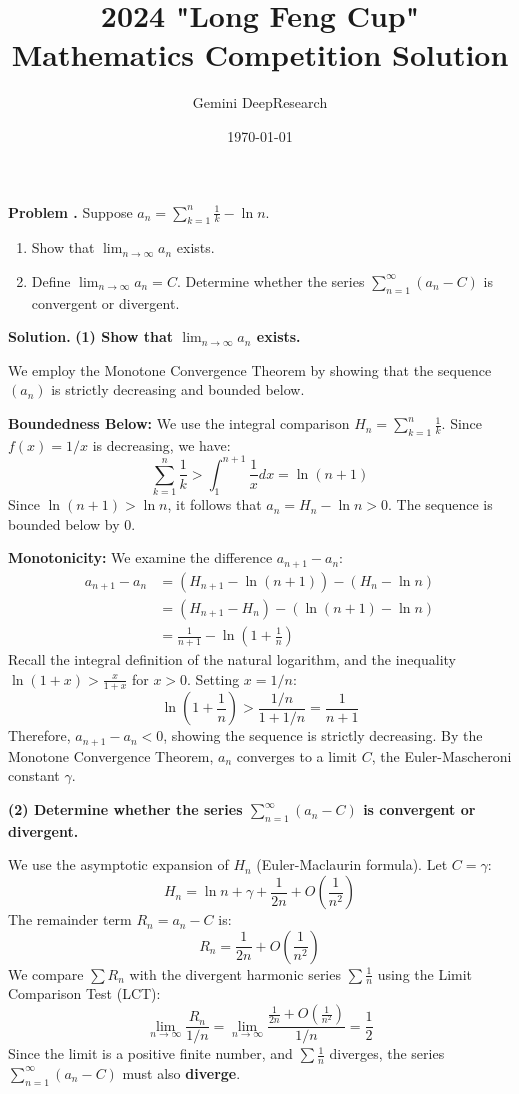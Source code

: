 \documentclass[12pt,a4paper,oneside]{article}
\title{\textbf{2024 "Long Feng Cup" Mathematics Competition Solution }}
\author{Gemini DeepResearch}
\date{\today}
\newcounter{problemname}
\newenvironment{problem}
  {\begin{shaded}\stepcounter{problemname}\par\noindent\textbf{Problem \arabic{problemname}.
}\newline}
  {\end{shaded}\par}
\newenvironment{solution}
  {\par\noindent\textbf{Solution. }\newline}
  {\par}
\begin{document}
\maketitle

\newpage
\begin{problem}
Suppose $a_{n}=\sum_{k=1}^{n}\frac{1}{k}-\ln n.$
\begin{enumerate}
\item Show that $\lim_{n\rightarrow\infty}a_{n}$ exists.
\item  Define $\lim_{n\rightarrow\infty}a_{n}=C.$ Determine whether the series $\sum_{n=1}^{\infty}(a_{n}-C)$ is convergent or divergent.
\end{enumerate}
\end{problem}

\begin{solution}
\textbf{(1) Show that $\lim_{n\rightarrow\infty}a_{n}$ exists.}

We employ the Monotone Convergence Theorem by showing that the sequence $(a_n)$ is strictly decreasing and bounded below.

\textbf{Boundedness Below:}
We use the integral comparison $H_n = \sum_{k=1}^n \frac{1}{k}$. Since $f(x) = 1/x$ is decreasing, we have:
$$\sum_{k=1}^n \frac{1}{k} > \int_1^{n+1} \frac{1}{x} dx = \ln(n+1)$$
Since $\ln(n+1) > \ln n$, it follows that $a_n = H_n - \ln n > 0$. The sequence is bounded below by 0.

\textbf{Monotonicity:}
We examine the difference $a_{n+1} - a_n$:
\begin{align*} a_{n+1} - a_n &= \left(H_{n+1} - \ln(n+1)\right) - \left(H_n - \ln n\right) \\ &= \left(H_{n+1} - H_n\right) - \left(\ln(n+1) - \ln n\right) \\ &= \frac{1}{n+1} - \ln\left(1 + \frac{1}{n}\right)\end{align*}
Recall the integral definition of the natural logarithm, and the inequality $\ln(1+x) > \frac{x}{1+x}$ for $x>0$. Setting $x=1/n$:
$$\ln\left(1 + \frac{1}{n}\right) > \frac{1/n}{1+1/n} = \frac{1}{n+1}$$
Therefore, $a_{n+1} - a_n < 0$, showing the sequence is strictly decreasing.
By the Monotone Convergence Theorem, $a_n$ converges to a limit $C$, the Euler-Mascheroni constant $\gamma$.

\textbf{(2) Determine whether the series $\sum_{n=1}^{\infty}(a_{n}-C)$ is convergent or divergent.}

We use the asymptotic expansion of $H_n$ (Euler-Maclaurin formula). Let $C=\gamma$:
$$H_n = \ln n + \gamma + \frac{1}{2n} + O\left(\frac{1}{n^2}\right)$$The remainder term $R_n = a_n - C$ is:$$R_n = \frac{1}{2n} + O\left(\frac{1}{n^2}\right)$$
We compare $\sum R_n$ with the divergent harmonic series $\sum \frac{1}{n}$ using the Limit Comparison Test (LCT):
$$ \lim_{n\rightarrow\infty} \frac{R_n}{1/n} = \lim_{n\rightarrow\infty} \frac{\frac{1}{2n} + O\left(\frac{1}{n^2}\right)}{1/n} = \frac{1}{2} $$
Since the limit is a positive finite number, and $\sum \frac{1}{n}$ diverges, the series $\sum_{n=1}^{\infty}(a_{n}-C)$ must also \textbf{diverge}.
\end{solution}
\end{document}
